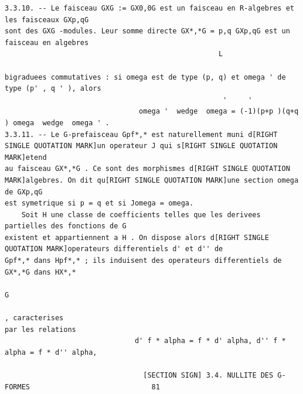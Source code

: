 \documentclass[
  11pt,
]{article}
\begin{document}
\begin{lstlisting}
3.3.10. -- Le faisceau GXG := GX0,0G est un faisceau en R-algebres et les faisceaux GXp,qG
sont des GXG -modules. Leur somme directe GX*,*G = p,q GXp,qG est un faisceau en algebres
                                                   L

bigraduees commutatives : si omega est de type (p, q) et omega ' de type (p' , q ' ), alors
                                                    '     '
                                omega '  wedge  omega = (-1)(p+p )(q+q ) omega  wedge  omega ' .
3.3.11. -- Le G-prefaisceau Gpf*,* est naturellement muni d[RIGHT SINGLE QUOTATION MARK]un operateur J qui s[RIGHT SINGLE QUOTATION MARK]etend
au faisceau GX*,*G . Ce sont des morphismes d[RIGHT SINGLE QUOTATION MARK]algebres. On dit qu[RIGHT SINGLE QUOTATION MARK]une section omega de GXp,qG
est symetrique si p = q et si Jomega = omega.
    Soit H une classe de coefficients telles que les derivees partielles des fonctions de G
existent et appartiennent a H . On dispose alors d[RIGHT SINGLE QUOTATION MARK]operateurs differentiels d' et d'' de
Gpf*,* dans Hpf*,* ; ils induisent des operateurs differentiels de GX*,*G dans HX*,*
                                                                                  G
                                                                                     , caracterises
par les relations
                               d' f * alpha = f * d' alpha, d'' f * alpha = f * d'' alpha,

                                 [SECTION SIGN] 3.4. NULLITE DES G-FORMES                             81


\end{lstlisting}
\end{document}
